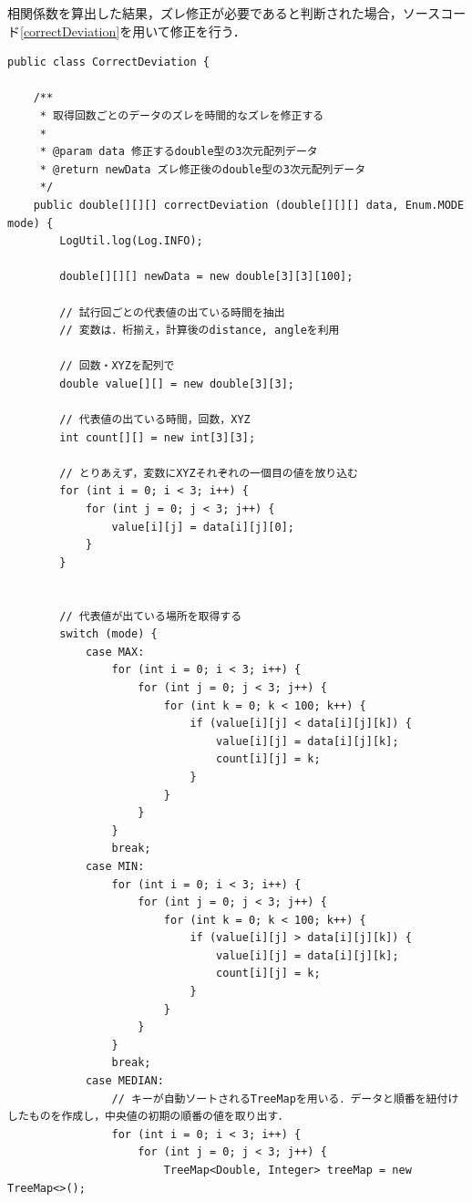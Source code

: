 \documentclass[11pt]{jreport}
\begin{document}
        相関係数を算出した結果，ズレ修正が必要であると判断された場合，ソースコード\ref{correctDeviation}を用いて修正を行う．

        \begin{lstlisting}[caption=ズレ修正アルゴリズム, label=correctDeviation]
public class CorrectDeviation {

    /**
     * 取得回数ごとのデータのズレを時間的なズレを修正する
     *
     * @param data 修正するdouble型の3次元配列データ
     * @return newData ズレ修正後のdouble型の3次元配列データ
     */
    public double[][][] correctDeviation (double[][][] data, Enum.MODE mode) {
        LogUtil.log(Log.INFO);

        double[][][] newData = new double[3][3][100];

        // 試行回ごとの代表値の出ている時間を抽出
        // 変数は．桁揃え，計算後のdistance, angleを利用

        // 回数・XYZを配列で
        double value[][] = new double[3][3];

        // 代表値の出ている時間，回数，XYZ
        int count[][] = new int[3][3];

        // とりあえず，変数にXYZそれぞれの一個目の値を放り込む
        for (int i = 0; i < 3; i++) {
            for (int j = 0; j < 3; j++) {
                value[i][j] = data[i][j][0];
            }
        }


        // 代表値が出ている場所を取得する
        switch (mode) {
            case MAX:
                for (int i = 0; i < 3; i++) {
                    for (int j = 0; j < 3; j++) {
                        for (int k = 0; k < 100; k++) {
                            if (value[i][j] < data[i][j][k]) {
                                value[i][j] = data[i][j][k];
                                count[i][j] = k;
                            }
                        }
                    }
                }
                break;
            case MIN:
                for (int i = 0; i < 3; i++) {
                    for (int j = 0; j < 3; j++) {
                        for (int k = 0; k < 100; k++) {
                            if (value[i][j] > data[i][j][k]) {
                                value[i][j] = data[i][j][k];
                                count[i][j] = k;
                            }
                        }
                    }
                }
                break;
            case MEDIAN:
                // キーが自動ソートされるTreeMapを用いる．データと順番を紐付けしたものを作成し，中央値の初期の順番の値を取り出す．
                for (int i = 0; i < 3; i++) {
                    for (int j = 0; j < 3; j++) {
                        TreeMap<Double, Integer> treeMap = new TreeMap<>();


\end{lstlisting}
\end{document}
